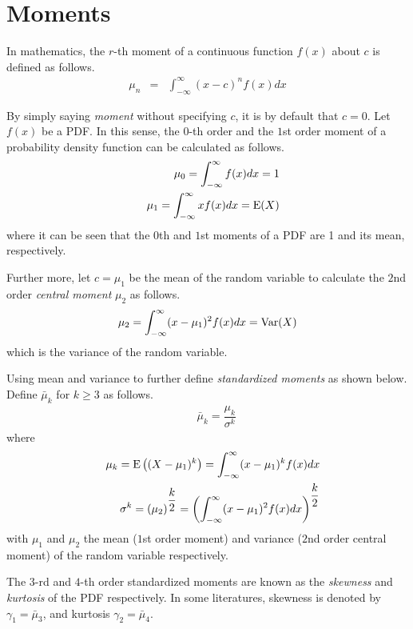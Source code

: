 \section{Moments} \label{sec:moments}

In mathematics, the $r$-th moment of a continuous function $f(x)$ about $c$ is defined as follows.
\begin{eqnarray}
  \mu_n &=& \int_{-\infty}^{\infty}(x-c)^nf(x)dx \nonumber
\end{eqnarray}

By simply saying \textit{moment} without specifying $c$, it is by default that $c=0$. Let $f(x)$ be a PDF. In this sense, the $0$-th order and the $1$st order moment of a probability density function can be calculated as follows.
\begin{eqnarray}
  && \mu_0 = \int_{-\infty}^{\infty}f(x)dx = 1 \nonumber \\
  && \mu_1 = \int_{-\infty}^{\infty}xf(x)dx = \textup{E}(X) \nonumber
\end{eqnarray}
where it can be seen that the $0$th and $1$st moments of a PDF are 1 and its mean, respectively.

Further more, let $c=\mu_1$ be the mean of the random variable to calculate the $2$nd order \textit{central moment} $\mu_2$ as follows.
\begin{eqnarray}
  \mu_2 = \int_{-\infty}^{\infty}(x-\mu_1)^2f(x)dx = \textup{Var}(X) \nonumber
\end{eqnarray}
which is the variance of the random variable.

Using mean and variance to further define \textit{standardized moments} as shown below. Define $\bar{\mu}_k$ for $k\geq 3$ as follows.
\begin{eqnarray}
  && \bar{\mu}_k = \dfrac{\mu_k}{\sigma^k} \nonumber
\end{eqnarray}
where
\begin{eqnarray}
	&& \mu_k = \textup{E}\left((X-\mu_1)^k\right) = \int_{-\infty}^{\infty}(x-\mu_1)^kf(x)dx \nonumber \\
	&& \sigma^k = \left(\mu_2\right)^{\dfrac{k}{2}} = \left(\int_{-\infty}^{\infty}(x-\mu_1)^2f(x)dx\right)^{\dfrac{k}{2}} \nonumber
\end{eqnarray}
with $\mu_1$ and $\mu_2$ the mean ($1$st order moment) and variance ($2$nd order central moment) of the random variable respectively.

The $3$-rd and $4$-th order standardized moments are known as the \textit{skewness} and \textit{kurtosis} of the PDF respectively. In some literatures, skewness is denoted by $\gamma_1 = \bar{\mu}_3$, and kurtosis $\gamma_2 = \bar{\mu}_4$.

